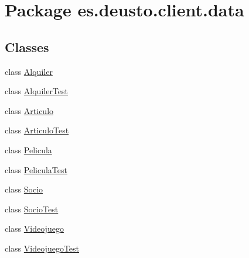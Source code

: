 \hypertarget{namespacees_1_1deusto_1_1client_1_1data}{}\section{Package es.\+deusto.\+client.\+data}
\label{namespacees_1_1deusto_1_1client_1_1data}
\subsection*{Classes}
\begin{DoxyCompactItemize}
\item 
class \mbox{\hyperlink{classes_1_1deusto_1_1client_1_1data_1_1_alquiler}{Alquiler}}
\item 
class \mbox{\hyperlink{classes_1_1deusto_1_1client_1_1data_1_1_alquiler_test}{Alquiler\+Test}}
\item 
class \mbox{\hyperlink{classes_1_1deusto_1_1client_1_1data_1_1_articulo}{Articulo}}
\item 
class \mbox{\hyperlink{classes_1_1deusto_1_1client_1_1data_1_1_articulo_test}{Articulo\+Test}}
\item 
class \mbox{\hyperlink{classes_1_1deusto_1_1client_1_1data_1_1_pelicula}{Pelicula}}
\item 
class \mbox{\hyperlink{classes_1_1deusto_1_1client_1_1data_1_1_pelicula_test}{Pelicula\+Test}}
\item 
class \mbox{\hyperlink{classes_1_1deusto_1_1client_1_1data_1_1_socio}{Socio}}
\item 
class \mbox{\hyperlink{classes_1_1deusto_1_1client_1_1data_1_1_socio_test}{Socio\+Test}}
\item 
class \mbox{\hyperlink{classes_1_1deusto_1_1client_1_1data_1_1_videojuego}{Videojuego}}
\item 
class \mbox{\hyperlink{classes_1_1deusto_1_1client_1_1data_1_1_videojuego_test}{Videojuego\+Test}}
\end{DoxyCompactItemize}
